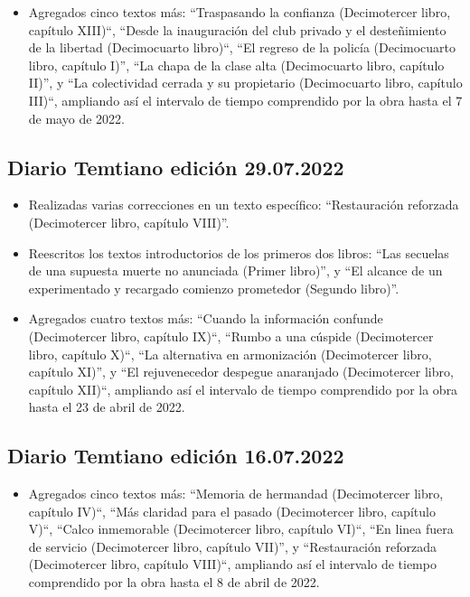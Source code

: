 \documentclass[
]{book}
\providecommand{\tightlist}{%
  \setlength{\itemsep}{0pt}\setlength{\parskip}{0pt}}
\begin{document}
\begin{itemize}
\tightlist
\item
  Agregados cinco textos más: ``Traspasando la confianza (Decimotercer libro, capítulo XIII)``, ``Desde la inauguración del club privado y el desteñimiento de la libertad (Decimocuarto libro)``, ``El regreso de la policía (Decimocuarto libro, capítulo I)'', ``La chapa de la clase alta (Decimocuarto libro, capítulo II)'', y ``La colectividad cerrada y su propietario (Decimocuarto libro, capítulo III)``, ampliando así el intervalo de tiempo comprendido por la obra hasta el 7 de mayo de 2022.
\end{itemize}

\hypertarget{diario-temtiano-ediciuxf3n-29.07.2022}{%
\subsection*{Diario Temtiano edición 29.07.2022}\label{diario-temtiano-ediciuxf3n-29.07.2022}}

\begin{itemize}
\item
  Realizadas varias correcciones en un texto específico: ``Restauración reforzada (Decimotercer libro, capítulo VIII)''.
\item
  Reescritos los textos introductorios de los primeros dos libros: ``Las secuelas de una supuesta muerte no anunciada (Primer libro)'', y ``El alcance de un experimentado y recargado comienzo prometedor (Segundo libro)''.
\item
  Agregados cuatro textos más: ``Cuando la información confunde (Decimotercer libro, capítulo IX)``, ``Rumbo a una cúspide (Decimotercer libro, capítulo X)``, ``La alternativa en armonización (Decimotercer libro, capítulo XI)'', y ``El rejuvenecedor despegue anaranjado (Decimotercer libro, capítulo XII)``, ampliando así el intervalo de tiempo comprendido por la obra hasta el 23 de abril de 2022.
\end{itemize}

\hypertarget{diario-temtiano-ediciuxf3n-16.07.2022}{%
\subsection*{Diario Temtiano edición 16.07.2022}\label{diario-temtiano-ediciuxf3n-16.07.2022}}

\begin{itemize}
\tightlist
\item
  Agregados cinco textos más: ``Memoria de hermandad (Decimotercer libro, capítulo IV)``, ``Más claridad para el pasado (Decimotercer libro, capítulo V)``, ``Calco inmemorable (Decimotercer libro, capítulo VI)``, ``En linea fuera de servicio (Decimotercer libro, capítulo VII)'', y ``Restauración reforzada (Decimotercer libro, capítulo VIII)``, ampliando así el intervalo de tiempo comprendido por la obra hasta el 8 de abril de 2022.
\end{itemize}
\end{document}
